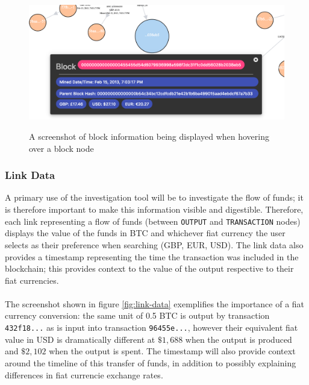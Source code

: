 \begin{figure}[h!]
  \centering
  \includegraphics[width = 15cm]{./figures/ui-screenshots/block-info}\\[0.5cm] 
  \caption{A screenshot of block information being displayed when hovering over a block node}
  \label{fig:block-info-on-hover}
\end{figure}

\subsubsection{Link Data}
A primary use of the investigation tool will be to investigate the flow of funds; it is therefore important to make this information visible and digestible. Therefore, each link representing a flow of funds (between \texttt{OUTPUT} and \texttt{TRANSACTION} nodes) displays the value of the funds in BTC and whichever fiat currency the user selects as their preference when searching (GBP, EUR, USD). The link data also provides a timestamp representing the time the transaction was included in the blockchain; this provides context to the value of the output respective to their fiat currencies. 
\\\\
The screenshot shown in figure \ref{fig:link-data} exemplifies the importance of a fiat currency conversion: the same unit of 0.5 BTC is output by transaction \texttt{432f18...} as is input into transaction \texttt{96455e...}, however their equivalent fiat value in USD is dramatically different at $\$1,688$ when the output is produced and $\$2,102$ when the output is spent. The timestamp will also provide context around the timeline of this transfer of funds, in addition to possibly explaining differences in fiat currencie exchange rates.

